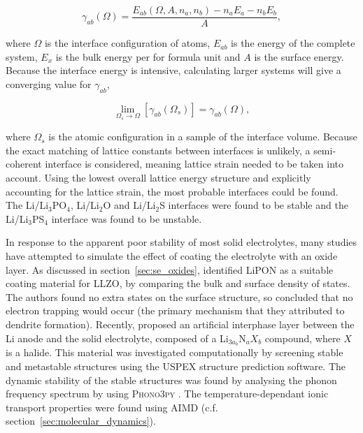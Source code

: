 \documentclass[../main.tex]{subfiles}
\begin{document}
\begin{equation}
    \gamma_{ab}(\Omega)=\frac{E_{ab}(\Omega,A,n_a,n_b)-n_aE_a-n_bE_b}{A},
\end{equation}

where $\Omega$ is the interface configuration of atoms, $E_{ab}$ is the energy of the complete system, $E_x$ is the bulk energy per for formula unit and $A$ is the surface energy. Because the interface energy is intensive, calculating larger systems will give a converging value for $\gamma_{ab}$,

\begin{equation}
    \lim_{\Omega_s \rightarrow \Omega} \left[\gamma_{ab}(\Omega_s)\right]=\gamma_{ab}(\Omega),
\end{equation}

where $\Omega_s$ is the atomic configuration in a sample of the interface volume. Because the exact matching of lattice constants between interfaces is unlikely, a semi-coherent interface is considered, meaning lattice strain needed to be taken into account. Using the lowest overall lattice energy structure and explicitly accounting for the lattice strain, the most probable interfaces could be found. The Li/Li$_3$PO$_4$, Li/Li$_2$O and Li/Li$_2$S interfaces were found to be stable and the Li/Li$_3$PS$_4$ interface was found to be unstable.\cite{Lepley2015}

In response to the apparent poor stability of most solid electrolytes, many studies have attempted to simulate the effect of coating the electrolyte with an oxide layer.\cite{Zhang2020directvis, Xiao2019coat, Tian2018} As discussed in section~\ref{sec:se_oxides}, \citeauthor{Tian2018} identified LiPON as a suitable coating material for LLZO, by comparing the bulk and surface density of states.\cite{Tian2018} The authors found no extra states on the surface structure, so concluded that no electron trapping would occur (the primary mechanism that they attributed to dendrite formation). Recently, \citeauthor{Sang2020} proposed an artificial interphase layer between the Li anode and the solid electrolyte, composed of a Li$_{3a_b}$N$_{a}X_{b}$ compound, where $X$ is a halide.\cite{Sang2020} This material was investigated computationally by screening stable and metastable structures using the USPEX structure prediction software.\cite{Glass2006, Oganov2006} The dynamic stability of the stable structures was found by analysing the phonon frequency spectrum by using \textsc{Phono3py} \cite{Parlinski1997, Togo2008,togo_distributions_2015}. The temperature-dependant ionic transport properties were found using AIMD (c.f. section~\ref{sec:molecular_dynamics}).
\end{document}
